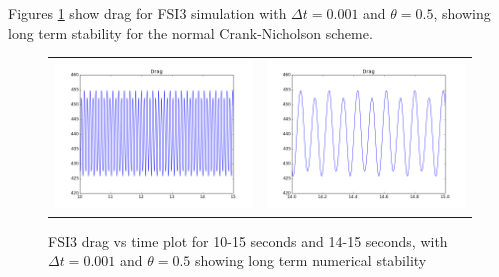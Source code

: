Figures \ref{fig: FSI3_long_short} show drag for FSI3 simulation with $\Delta t = 0.001$ and $\theta = 0.5$, showing long term stability for the normal Crank-Nicholson scheme.

\begin{figure}[H]
\begin{tabular}{ll}
\includegraphics[scale=0.4]{./Temporal_stability/FSI3_0001_050_big.png}
&
\includegraphics[scale=0.4]{./Temporal_stability/FSI3_0001_050_small.png}
\end{tabular}
\caption{FSI3 drag vs time plot for 10-15 seconds and 14-15 seconds, with $\Delta t = 0.001$ and $\theta =0.5$ showing long term numerical stability}
\label{fig: FSI3_long_short}
\end{figure}

